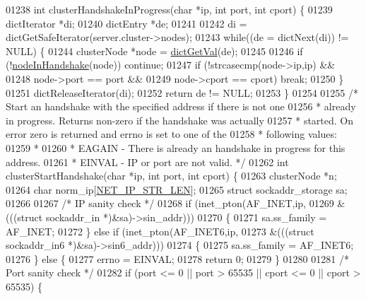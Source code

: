 \begin{DoxyCode}
{{{{{{{{{{{{{{{{{01238 \textcolor{keywordtype}{int} clusterHandshakeInProgress(\textcolor{keywordtype}{char} *ip, \textcolor{keywordtype}{int} port, \textcolor{keywordtype}{int} cport) \{
01239     dictIterator *di;
01240     dictEntry *de;
01241 
01242     di = dictGetSafeIterator(server.cluster->nodes);
01243     \textcolor{keywordflow}{while}((de = dictNext(di)) != NULL) \{
01244         clusterNode *node = \hyperlink{dict_8h_ae8d2cc391873b2bea2b87c4f80f43120}{dictGetVal}(de);
01245 
01246         \textcolor{keywordflow}{if} (!\hyperlink{cluster_8h_a70f1a5bb82f54ce5d17b13de42176790}{nodeInHandshake}(node)) \textcolor{keywordflow}{continue};
01247         \textcolor{keywordflow}{if} (!strcasecmp(node->ip,ip) &&
01248             node->port == port &&
01249             node->cport == cport) \textcolor{keywordflow}{break};
01250     \}
01251     dictReleaseIterator(di);
01252     \textcolor{keywordflow}{return} de != NULL;
01253 \}
01254 
01255 \textcolor{comment}{/* Start an handshake with the specified address if there is not one}
01256 \textcolor{comment}{ * already in progress. Returns non-zero if the handshake was actually}
01257 \textcolor{comment}{ * started. On error zero is returned and errno is set to one of the}
01258 \textcolor{comment}{ * following values:}
01259 \textcolor{comment}{ *}
01260 \textcolor{comment}{ * EAGAIN - There is already an handshake in progress for this address.}
01261 \textcolor{comment}{ * EINVAL - IP or port are not valid. */}
01262 \textcolor{keywordtype}{int} clusterStartHandshake(\textcolor{keywordtype}{char} *ip, \textcolor{keywordtype}{int} port, \textcolor{keywordtype}{int} cport) \{
01263     clusterNode *n;
01264     \textcolor{keywordtype}{char} norm\_ip[\hyperlink{server_8h_ad97c5405ed22a94e9fcc10fba577d6c0}{NET\_IP\_STR\_LEN}];
01265     \textcolor{keyword}{struct} sockaddr\_storage sa;
01266 
01267     \textcolor{comment}{/* IP sanity check */}
01268     \textcolor{keywordflow}{if} (inet\_pton(AF\_INET,ip,
01269             &(((\textcolor{keyword}{struct} sockaddr\_in *)&sa)->sin\_addr)))
01270     \{
01271         sa.ss\_family = AF\_INET;
01272     \} \textcolor{keywordflow}{else} \textcolor{keywordflow}{if} (inet\_pton(AF\_INET6,ip,
01273             &(((\textcolor{keyword}{struct} sockaddr\_in6 *)&sa)->sin6\_addr)))
01274     \{
01275         sa.ss\_family = AF\_INET6;
01276     \} \textcolor{keywordflow}{else} \{
01277         errno = EINVAL;
01278         \textcolor{keywordflow}{return} 0;
01279     \}
01280 
01281     \textcolor{comment}{/* Port sanity check */}
01282     \textcolor{keywordflow}{if} (port <= 0 || port > 65535 || cport <= 0 || cport > 65535) \{
}}}}}}}}}}}}}}}}}
\end{DoxyCode}
